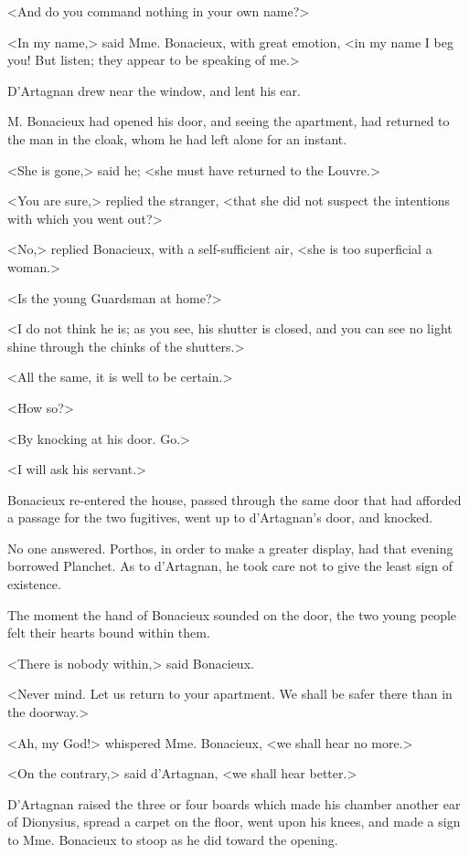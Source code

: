 <And do you command nothing in your own name?> 

<In my name,> said Mme. Bonacieux, with great emotion, <in my name I beg you! But listen; they appear to be speaking of me.> 

D'Artagnan drew near the window, and lent his ear. 

M. Bonacieux had opened his door, and seeing the apartment, had returned to the man in the cloak, whom he had left alone for an instant. 

<She is gone,> said he; <she must have returned to the Louvre.> 

<You are sure,> replied the stranger, <that she did not suspect the intentions with which you went out?> 

<No,> replied Bonacieux, with a self-sufficient air, <she is too superficial a woman.> 

<Is the young Guardsman at home?> 

<I do not think he is; as you see, his shutter is closed, and you can see no light shine through the chinks of the shutters.> 

<All the same, it is well to be certain.> 

<How so?> 

<By knocking at his door. Go.> 

<I will ask his servant.> 

Bonacieux re-entered the house, passed through the same door that had afforded a passage for the two fugitives, went up to d'Artagnan's door, and knocked. 

No one answered. Porthos, in order to make a greater display, had that evening borrowed Planchet. As to d'Artagnan, he took care not to give the least sign of existence. 

The moment the hand of Bonacieux sounded on the door, the two young people felt their hearts bound within them. 

<There is nobody within,> said Bonacieux. 

<Never mind. Let us return to your apartment. We shall be safer there than in the doorway.> 

<Ah, my God!> whispered Mme. Bonacieux, <we shall hear no more.> 

<On the contrary,> said d'Artagnan, <we shall hear better.> 

D'Artagnan raised the three or four boards which made his chamber another ear of Dionysius, spread a carpet on the floor, went upon his knees, and made a sign to Mme. Bonacieux to stoop as he did toward the opening. 

